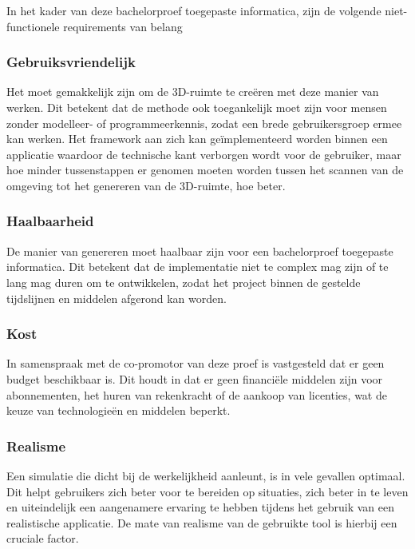 In het kader van deze bachelorproef toegepaste informatica, zijn de volgende niet-functionele requirements van belang

\subsubsection{Gebruiksvriendelijk}

Het moet gemakkelijk zijn om de 3D-ruimte te creëren met deze manier van werken. Dit betekent dat de methode ook toegankelijk moet zijn voor mensen zonder modelleer- of programmeerkennis, zodat een brede gebruikersgroep ermee kan werken. Het framework aan zich kan geïmplementeerd worden binnen een applicatie waardoor de technische kant verborgen wordt voor de gebruiker, maar hoe minder tussenstappen er genomen moeten worden tussen het scannen van de omgeving tot het genereren van de 3D-ruimte, hoe beter.

\subsubsection{Haalbaarheid}

De manier van genereren moet haalbaar zijn voor een bachelorproef toegepaste informatica. Dit betekent dat de implementatie niet te complex mag zijn of te lang mag duren om te ontwikkelen, zodat het project binnen de gestelde tijdslijnen en middelen afgerond kan worden.


\subsubsection{Kost}

In samenspraak met de co-promotor van deze proef is vastgesteld dat er geen budget beschikbaar is. Dit houdt in dat er geen financiële middelen zijn voor abonnementen, het huren van rekenkracht of de aankoop van licenties, wat de keuze van technologieën en middelen beperkt.

\subsubsection{Realisme}

Een simulatie die dicht bij de werkelijkheid aanleunt, is in vele gevallen optimaal. Dit helpt gebruikers zich beter voor te bereiden op situaties, zich beter in te leven en uiteindelijk een aangenamere ervaring te hebben tijdens het gebruik van een realistische applicatie. De mate van realisme van de gebruikte tool is hierbij een cruciale factor.

